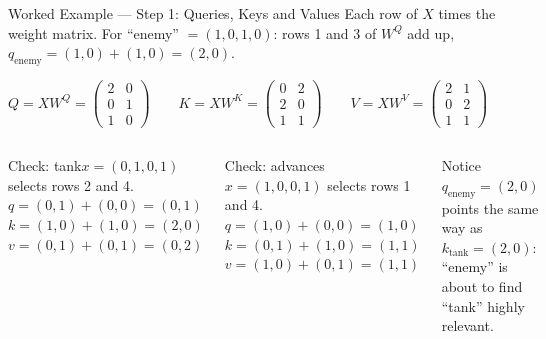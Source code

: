 \documentclass[aspectratio=169,10pt]{beamer}
\begin{document}
\begin{frame}{Worked Example --- Step 1: Queries, Keys and Values}
Each row of $X$ times the weight matrix. For ``enemy'' $=(1,0,1,0)$: rows 1 and 3 of $W^Q$ add up, $q_{\text{enemy}}=(1,0)+(1,0)=(2,0)$.
\vspace{3pt}

\centering
$Q=XW^{Q}=\begin{pmatrix}2&0\\0&1\\1&0\end{pmatrix}\qquad
K=XW^{K}=\begin{pmatrix}0&2\\2&0\\1&1\end{pmatrix}\qquad
V=XW^{V}=\begin{pmatrix}2&1\\0&2\\1&1\end{pmatrix}$
\vspace{4pt}

\raggedright
\begin{columns}[T]
\begin{cbox}{Check: tank}\scriptsize $x=(0,1,0,1)$ selects rows 2 and 4.\\$q=(0,1)+(0,0)=(0,1)$\\$k=(1,0)+(1,0)=(2,0)$\\$v=(0,1)+(0,1)=(0,2)$\end{cbox}
\begin{cbox}{Check: advances}\scriptsize $x=(1,0,0,1)$ selects rows 1 and 4.\\$q=(1,0)+(0,0)=(1,0)$\\$k=(0,1)+(1,0)=(1,1)$\\$v=(1,0)+(0,1)=(1,1)$\end{cbox}
\begin{ibox}\scriptsize Notice $q_{\text{enemy}}=(2,0)$ points the same way as $k_{\text{tank}}=(2,0)$: ``enemy'' is about to find ``tank'' highly relevant.\end{ibox}
\end{columns}
\end{frame}
\end{document}
